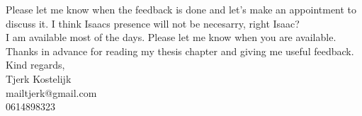 Please let me know when the feedback is done and let's make an appointment to discuss it. I think Isaacs presence will not be necesarry, right Isaac?\\
I am available most of the days. Please let me know when you are available.\\

Thanks in advance for reading my thesis chapter and giving me useful feedback.\\

Kind regards,\\
Tjerk Kostelijk\\
mailtjerk@gmail.com\\
0614898323
